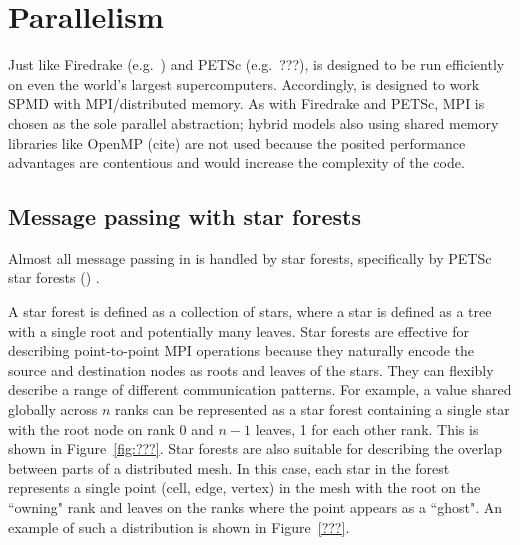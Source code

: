 \documentclass[thesis]{subfiles}
\begin{document}
\chapter{Parallelism}
\label{chapter:parallel}

Just like Firedrake (e.g.~\cite{betteridgeCodeGenerationProductive2021}) and PETSc (e.g.~???),  is designed to be run efficiently on even the world's largest supercomputers.
Accordingly,  is designed to work SPMD with MPI/distributed memory.
As with Firedrake and PETSc, MPI is chosen as the sole parallel abstraction; hybrid models also using shared memory libraries like OpenMP (cite) are not used because the posited performance advantages are contentious \parencite{knepleyExascaleComputingThreads2015} and would increase the complexity of the code.

\section{Message passing with star forests}

Almost all message passing in  is handled by star forests, specifically by PETSc star forests () \parencite{zhangPetscSFScalableCommunication2021}.

A star forest is defined as a collection of stars, where a star is defined as a tree with a single root and potentially many leaves.
Star forests are effective for describing point-to-point MPI operations because they naturally encode the source and destination nodes as roots and leaves of the stars.
They can flexibly describe a range of different communication patterns.
For example, a value shared globally across $n$ ranks can be represented as a star forest containing a single star with the root node on rank 0 and $n-1$ leaves, 1 for each other rank.
This is shown in Figure~\ref{fig:???}.
Star forests are also suitable for describing the overlap between parts of a distributed mesh.
In this case, each star in the forest represents a single point (cell, edge, vertex) in the mesh with the root on the ``owning" rank and leaves on the ranks where the point appears as a ``ghost".
An example of such a distribution is shown in Figure~\ref{???}.

\begin{figure}


% 


\end{figure}
\end{document}
